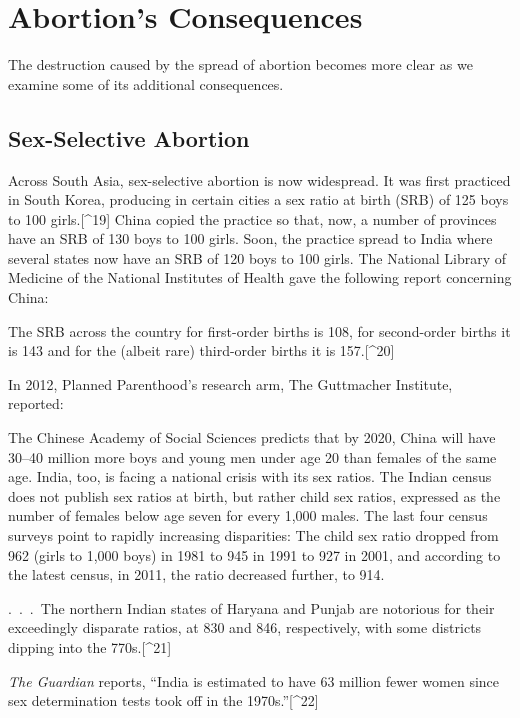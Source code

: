 \documentclass[
]{book}
\begin{document}
\hypertarget{abortions-consequences}{%
\section{Abortion's Consequences}\label{abortions-consequences}}

The destruction caused by the spread of abortion becomes more clear as we examine some of its additional consequences.

\hypertarget{sex-selective-abortion}{%
\subsection{Sex-Selective Abortion}\label{sex-selective-abortion}}

Across South Asia, sex-selective abortion is now widespread. It was first practiced in South Korea, producing in certain cities a sex ratio at birth (SRB) of 125 boys to 100 girls.{[}\^{}19{]} China copied the practice so that, now, a number of provinces have an SRB of 130 boys to 100 girls. Soon, the practice spread to India where several states now have an SRB of 120 boys to 100 girls. The National Library of Medicine of the National Institutes of Health gave the following report concerning China:

The SRB across the country for first-order births is 108, for second-order births it is 143 and for the (albeit rare) third-order births it is 157.{[}\^{}20{]}

In 2012, Planned Parenthood's research arm, The Guttmacher Institute, reported:

The Chinese Academy of Social Sciences predicts that by 2020, China will have 30--40 million more boys and young men under age 20 than females of the same age. India, too, is facing a national crisis with its sex ratios. The Indian census does not publish sex ratios at birth, but rather child sex ratios, expressed as the number of females below age seven for every 1,000 males. The last four census surveys point to rapidly increasing disparities: The child sex ratio dropped from 962 (girls to 1,000 boys) in 1981 to 945 in 1991 to 927 in 2001, and according to the latest census, in 2011, the ratio decreased further, to 914.

.~.~.~The northern Indian states of Haryana and Punjab are notorious for their exceedingly disparate ratios, at 830 and 846, respectively, with some districts dipping into the 770s.{[}\^{}21{]}

\emph{The Guardian} reports, ``India is estimated to have 63 million fewer women since sex determination tests took off in the 1970s.''{[}\^{}22{]}
\end{document}
